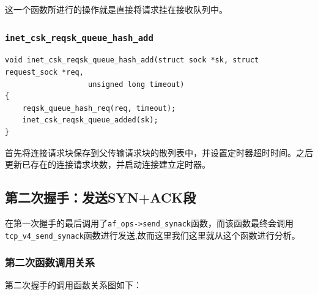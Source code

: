                 这一个函数所进行的操作就是直接将请求挂在接收队列中。

            \subsubsection{\texttt{inet_csk_reqsk_queue_hash_add}}

\begin{verbatim}
void inet_csk_reqsk_queue_hash_add(struct sock *sk, struct request_sock *req,
                   unsigned long timeout)
{
    reqsk_queue_hash_req(req, timeout);
    inet_csk_reqsk_queue_added(sk);
}
\end{verbatim}

                首先将连接请求块保存到父传输请求块的散列表中，并设置定时器超时时间。之后更新已存在的连接请求块数，并启动连接建立定时器。


        \subsection{第二次握手：发送SYN+ACK段}
            在第一次握手的最后调用了\texttt{af_ops->send_synack}函数，而该函数最终会调用\texttt{tcp_v4_send_synack}函数进行发送,故而这里我们这里就从这个函数进行分析。
            \subsubsection{第二次函数调用关系}            
                第二次握手的调用函数关系图如下：
                \begin{figure}[htb]        
                \end{figure}   
